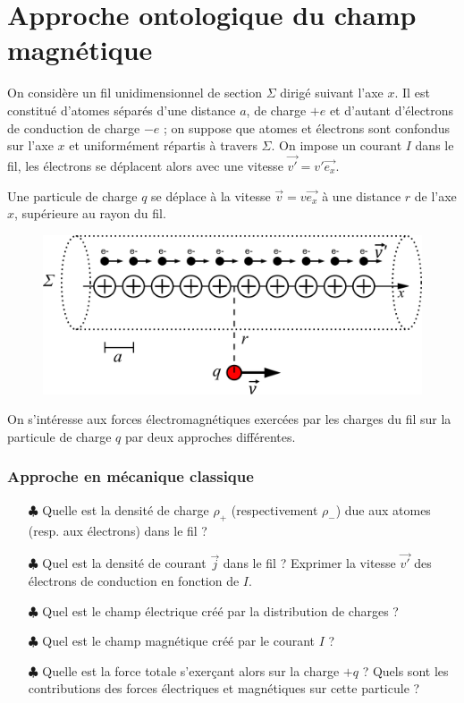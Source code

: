 \documentclass{report}
\begin{document}
\section*{Approche ontologique du champ magnétique}

On considère un fil unidimensionnel de section $\Sigma$ dirigé suivant l'axe $x$. Il est constitué d'atomes séparés d'une distance $a$, de charge $+e$  et d'autant d'électrons de conduction de charge $-e$ ; on suppose que atomes et électrons sont confondus sur l'axe $x$ et uniformément répartis à travers $\Sigma$. On impose un courant $I$ dans le fil, les électrons se déplacent alors avec une vitesse $\vec{v'}=v'\vec{e_{x}}$.

Une particule de charge $q$ se déplace à la vitesse $\vec{v}=v\vec{e_{x}}$ à une distance $r$ de l'axe $x$, supérieure au rayon du fil.

\begin{figure}[h!]
\centering
		\includegraphics[scale=0.25]{cable.pdf}
\end{figure}

On s'intéresse aux forces électromagnétiques exercées par les charges du fil sur la particule de charge $q$ par deux approches différentes.

\subsubsection*{Approche en mécanique classique}

\begin{itemize}
	\item[$\clubsuit$] Quelle est la densité de charge $\rho_{+}$ (respectivement $\rho_{-}$) due aux atomes (resp. aux électrons) dans le fil ? 
	
	\item[$\clubsuit$] Quel est la densité de courant $\vec{j}$ dans le fil ? Exprimer la vitesse $\vec{v'}$ des électrons de conduction en fonction de $I$.
	
	\item[$\clubsuit$] Quel est le champ électrique créé par la distribution de charges ? 
	\item[$\clubsuit$] Quel est le champ magnétique créé par le courant $I$ ?
		\item[$\clubsuit$] Quelle est la force totale s'exerçant alors sur la charge $+q$ ? Quels sont les contributions des forces électriques et magnétiques sur cette particule ?
\end{itemize}
\end{document}
